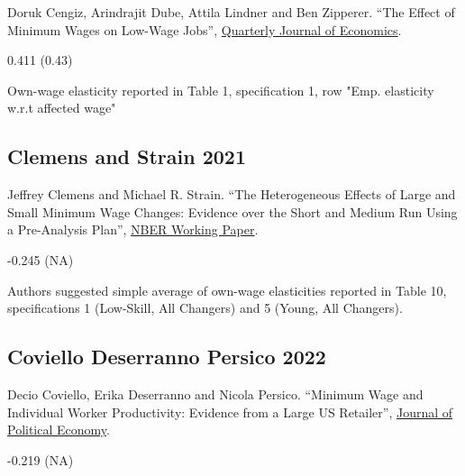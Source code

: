 \noindent Doruk Cengiz, Arindrajit Dube, Attila Lindner and Ben Zipperer. ``The Effect of Minimum Wages on Low-Wage Jobs'', \href{https://doi.org/10.1093/qje/qjz014}{Quarterly Journal of Economics}.

\vspace{0.7em}

 0.411 (0.43)

\vspace{0.7em}

 Own-wage elasticity reported in Table 1, specification 1, row "Emp. elasticity w.r.t affected wage"

\subsection*{Clemens and Strain 2021}
\vspace{-0.7em}

\noindent Jeffrey Clemens and Michael R. Strain. ``The Heterogeneous Effects of Large and Small Minimum Wage Changes: Evidence over the Short and Medium Run Using a Pre-Analysis Plan'', \href{https://www.nber.org/system/files/working_papers/w29264/w29264.pdf}{NBER Working Paper}.

\vspace{0.7em}

 -0.245 (NA)

\vspace{0.7em}

 Authors suggested simple average of own-wage elasticities reported in Table 10, specifications 1 (Low-Skill, All Changers) and 5 (Young, All Changers).

\subsection*{Coviello Deserranno Persico 2022}
\vspace{-0.7em}

\noindent Decio Coviello, Erika Deserranno and Nicola Persico. ``Minimum Wage and Individual Worker Productivity: Evidence from a Large US Retailer'', \href{https://doi.org/10.1086/720397}{Journal of Political Economy}.

\vspace{0.7em}

 -0.219 (NA)

